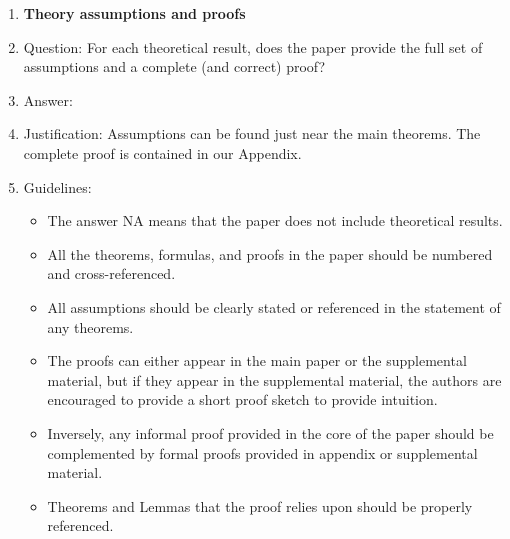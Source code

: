 \documentclass{article}
\theoremstyle{definition}
\begin{document}
\begin{enumerate}
\item {\bf Theory assumptions and proofs}
    \item[] Question: For each theoretical result, does the paper provide the full set of assumptions and a complete (and correct) proof?
    \item[] Answer: \answerYes{} %
    \item[] Justification: Assumptions can be found just near the main theorems. The complete proof is contained in our Appendix.
    \item[] Guidelines:
    \begin{itemize}
        \item The answer NA means that the paper does not include theoretical results. 
        \item All the theorems, formulas, and proofs in the paper should be numbered and cross-referenced.
        \item All assumptions should be clearly stated or referenced in the statement of any theorems.
        \item The proofs can either appear in the main paper or the supplemental material, but if they appear in the supplemental material, the authors are encouraged to provide a short proof sketch to provide intuition. 
        \item Inversely, any informal proof provided in the core of the paper should be complemented by formal proofs provided in appendix or supplemental material.
        \item Theorems and Lemmas that the proof relies upon should be properly referenced. 
    \end{itemize}


\end{enumerate}
\end{document}
